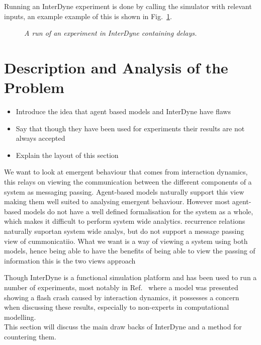 \documentclass{article}
\begin{document}

Running an InterDyne experiment is done by calling the simulator with relevant inputs, an example example of this is shown in Fig.~\ref{fig:runninginterdyne}.
\begin{figure}[H]
	\centering
        
	\caption{\it A run of an experiment in InterDyne containing delays.}
	\label{fig:runninginterdyne}
\end{figure} 









\section {Description and Analysis of the Problem} \label{despriptionandanalysproblem}
\begin{itemize}
  \item Introduce the idea that agent based models and InterDyne have flaws
  \item Say that though they have been used for experiments their results are not always accepted 
  \item Explain the layout of this section 
\end{itemize}


We want to look at emergent behaviour that comes from interaction dynamics, this relays on viewing the communication between the different components of a system as messaging passing. Agent-based models naturally support this view  making them well suited to analysing emergent behaviour. However most agent-based models do not have a well defined formalisation for the system as a whole, which makes it difficult to perform system wide analytics. 
recurrence relations naturally suportan system wide analys, but do not support a message passing view of cummonicatiio.
What we want is a way of viewing a system using both models, hence being able to have the benefits of being able to view the passing of information  this is the two views approach 



Though InterDyne is a functional simulation platform and has been used to run a number of experiments, most notably in Ref.~\cite{DynamicCoupling_Chris} where a model was presented showing a flash crash caused by interaction dynamics, it possesses a concern when discussing these results, especially to non-experts in computational modelling.\\
This section will discuss the main draw backs of InterDyne and a method for countering them.  
\end{document}
